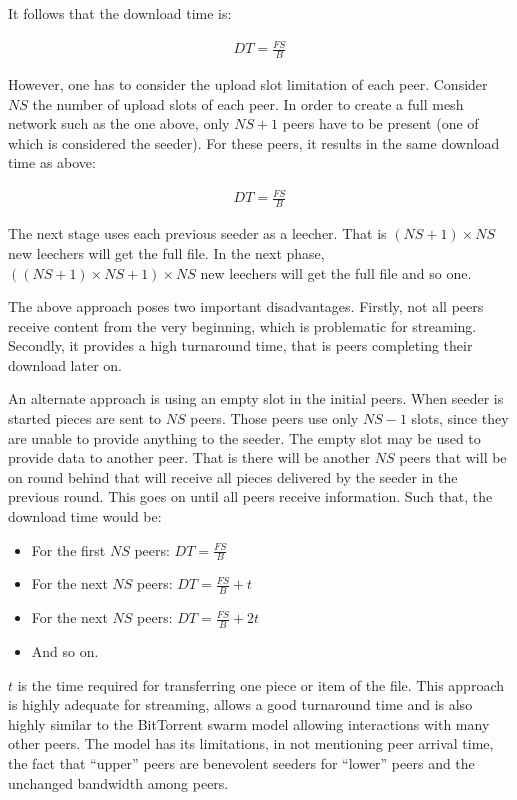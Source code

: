 It follows that the download time is:

\begin{align}
  DT = \frac{FS}{B}
\end{align}

However, one has to consider the upload slot limitation of each peer.
Consider $NS$ the number of upload slots of each peer. In order to create a
full mesh network such as the one above, only $NS+1$ peers have to be present
(one of which is considered the seeder). For these peers, it results in the
same download time as above:

\begin{align}
  DT = \frac{FS}{B}
\end{align}

The next stage uses each previous seeder as a leecher. That is $(NS+1) \times
NS$ new leechers will get the full file. In the next phase, $((NS+1) \times
NS+1) \times NS$ new leechers will get the full file and so one.

The above approach poses two important disadvantages. Firstly, not all peers
receive content from the very beginning, which is problematic for streaming.
Secondly, it provides a high turnaround time, that is peers completing their
download later on.

An alternate approach is using an empty slot in the initial peers. When
seeder is started pieces are sent to $NS$ peers. Those peers use only $NS-1$
slots, since they are unable to provide anything to the seeder. The empty slot
may be used to provide data to another peer. That is there will be another
$NS$ peers that will be on round behind that will receive all pieces delivered
by the seeder in the previous round. This goes on until all peers receive
information. Such that, the download time would be:

\begin{itemize}
  \item For the first $NS$ peers: $DT = \frac{FS}{B}$
  \item For the next $NS$ peers: $DT = \frac{FS}{B} + t$
  \item For the next $NS$ peers: $DT = \frac{FS}{B} + 2t$
  \item And so on.
\end{itemize}

$t$ is the time required for transferring one piece or item of the file. This
approach is highly adequate for streaming, allows a good turnaround time and
is also highly similar to the BitTorrent swarm model allowing interactions
with many other peers. The model has its limitations, in not mentioning peer
arrival time, the fact that ``upper'' peers are benevolent seeders for
``lower'' peers and the unchanged bandwidth among peers.
